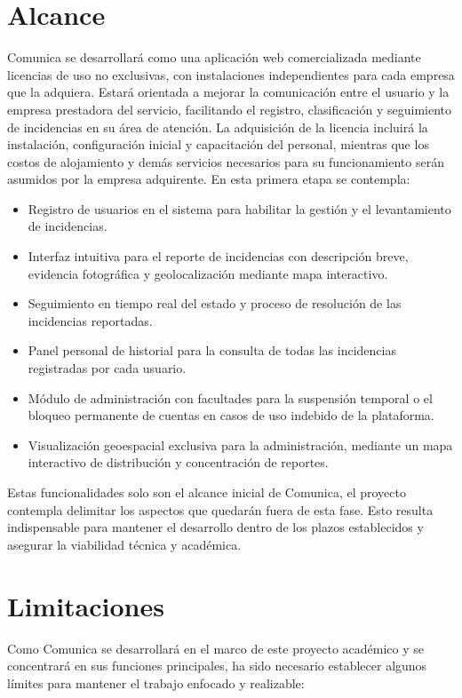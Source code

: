 \section{Alcance}
\label{subsec:alcance}
Comunica se desarrollará como una aplicación web comercializada mediante licencias de uso no exclusivas, con instalaciones independientes para cada empresa que la adquiera. Estará orientada a mejorar la comunicación entre el usuario y la empresa prestadora del servicio, facilitando el registro, clasificación y seguimiento de incidencias en su área de atención. La adquisición de la licencia incluirá la instalación, configuración inicial y capacitación del personal, mientras que los costos de alojamiento y demás servicios necesarios para su funcionamiento serán asumidos por la empresa adquirente. En esta primera etapa se contempla:
\begin{itemize}
	\item Registro de usuarios en el sistema para habilitar la gestión y el levantamiento de incidencias.
	
	\item Interfaz intuitiva para el reporte de incidencias con descripción breve, evidencia fotográfica y geolocalización mediante mapa interactivo.
	
	\item Seguimiento en tiempo real del estado y proceso de resolución de las incidencias reportadas.
	
	\item Panel personal de historial para la consulta de todas las incidencias registradas por cada usuario.
	
	\item Módulo de administración con facultades para la suspensión temporal o el bloqueo permanente de cuentas en casos de uso indebido de la plataforma.
	
	\item Visualización geoespacial exclusiva para la administración, mediante un mapa interactivo de distribución y concentración de reportes.
\end{itemize}

Estas funcionalidades solo son el alcance inicial de Comunica, el proyecto contempla delimitar los aspectos que quedarán fuera de esta fase. Esto resulta indispensable para mantener el desarrollo dentro de los plazos establecidos y asegurar la viabilidad técnica y académica.

\section{Limitaciones}
\label{subsec:limitaciones}
Como Comunica se desarrollará en el marco de este proyecto académico y se concentrará en sus funciones principales, ha sido necesario establecer algunos límites para mantener el trabajo enfocado y realizable:

